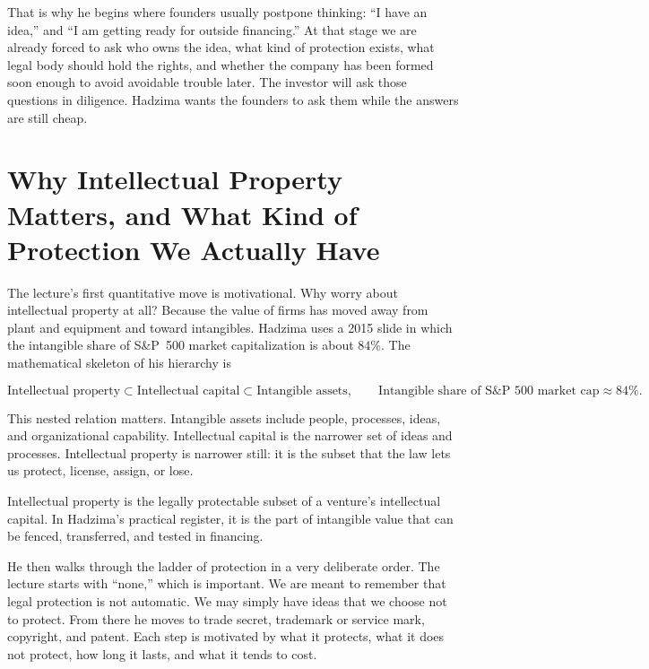 That is why he begins where founders usually postpone thinking: ``I have an idea,'' and ``I am getting ready for outside financing.'' At that stage we are already forced to ask who owns the idea, what kind of protection exists, what legal body should hold the rights, and whether the company has been formed soon enough to avoid avoidable trouble later. The investor will ask those questions in diligence. Hadzima wants the founders to ask them while the answers are still cheap.

\section{Why Intellectual Property Matters, and What Kind of Protection We Actually Have}

The lecture's first quantitative move is motivational. Why worry about intellectual property at all? Because the value of firms has moved away from plant and equipment and toward intangibles. Hadzima uses a 2015 slide in which the intangible share of S\&P~500 market capitalization is about \(84\%\). The mathematical skeleton of his hierarchy is

\begin{equation}
\text{Intellectual property}\subset \text{Intellectual capital}\subset \text{Intangible assets},
\qquad
\text{Intangible share of S\&P 500 market cap}\approx 84\%.
\end{equation}

This nested relation matters. Intangible assets include people, processes, ideas, and organizational capability. Intellectual capital is the narrower set of ideas and processes. Intellectual property is narrower still: it is the subset that the law lets us protect, license, assign, or lose.

\begin{definition}
Intellectual property is the legally protectable subset of a venture's intellectual capital. In Hadzima's practical register, it is the part of intangible value that can be fenced, transferred, and tested in financing.
\end{definition}

He then walks through the ladder of protection in a very deliberate order. The lecture starts with ``none,'' which is important. We are meant to remember that legal protection is not automatic. We may simply have ideas that we choose not to protect. From there he moves to trade secret, trademark or service mark, copyright, and patent. Each step is motivated by what it protects, what it does not protect, how long it lasts, and what it tends to cost.

